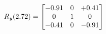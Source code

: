 \documentclass[preview]{standalone}
\begin{document}
\begin{align*}
\special{dvisvgm:raw <g id='unique000'>}R_{y}(2.72) = \begin{bmatrix}-0.91 & 0 & +0.41 \\0 & 1 & 0 \\-0.41 & 0 & -0.91\end{bmatrix}\special{dvisvgm:raw </g>}
\end{align*}
\end{document}
